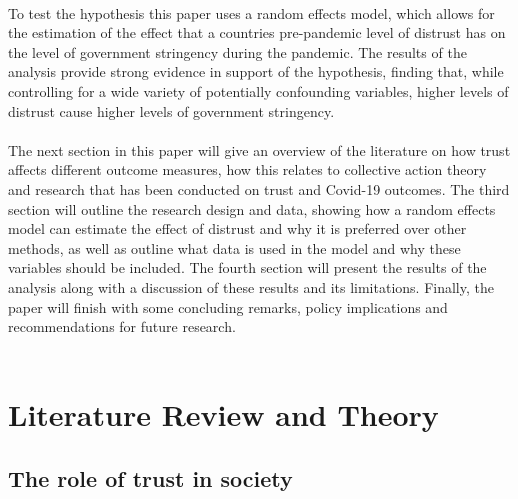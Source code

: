 \documentclass[
  11pt,
]{article}
\begin{document}
~\\
To test the hypothesis this paper uses a random effects model, which allows for the estimation of the effect that a countries pre-pandemic level of distrust has on the level of government stringency during the pandemic. The results of the analysis provide strong evidence in support of the hypothesis, finding that, while controlling for a wide variety of potentially confounding variables, higher levels of distrust cause higher levels of government stringency.\\
~\\
The next section in this paper will give an overview of the literature on how trust affects different outcome measures, how this relates to collective action theory and research that has been conducted on trust and Covid-19 outcomes. The third section will outline the research design and data, showing how a random effects model can estimate the effect of distrust and why it is preferred over other methods, as well as outline what data is used in the model and why these variables should be included. The fourth section will present the results of the analysis along with a discussion of these results and its limitations. Finally, the paper will finish with some concluding remarks, policy implications and recommendations for future research.\\
~\\

\hypertarget{literature-review-and-theory}{%
\section{Literature Review and Theory}\label{literature-review-and-theory}}

\hypertarget{the-role-of-trust-in-society}{%
\subsection{The role of trust in society}\label{the-role-of-trust-in-society}}
\end{document}
